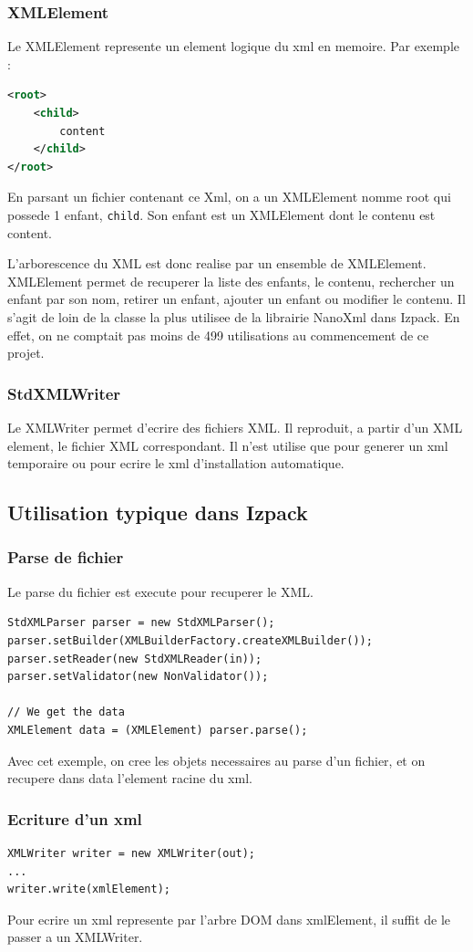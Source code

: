 \subsubsection{XMLElement}
Le XMLElement represente un element logique du xml en memoire. Par exemple :
\begin{lstlisting}[language=xml]
<root>
	<child>
		content
	</child>
</root>
\end{lstlisting}
En parsant un fichier contenant ce Xml, on a un XMLElement nomme root qui possede 1 enfant, \verb|child|. Son enfant est un XMLElement dont le contenu est content.

L'arborescence du XML est donc realise par un ensemble de XMLElement. XMLElement permet de recuperer la liste des enfants, le contenu, rechercher un enfant par son nom, retirer un enfant, ajouter un enfant ou modifier le contenu. Il s'agit de loin de la classe la plus utilisee de la librairie NanoXml dans Izpack. En effet, on ne comptait pas moins de 499 utilisations au commencement de ce projet.
\subsubsection{StdXMLWriter}
Le XMLWriter permet d'ecrire des fichiers XML. Il reproduit, a partir d'un XML element, le fichier XML correspondant. Il n'est utilise que pour generer un xml temporaire ou pour ecrire le xml d'installation automatique. 
\subsection{Utilisation typique dans Izpack}
\subsubsection{Parse de fichier}
Le parse du fichier est execute pour recuperer le XML.
\begin{lstlisting}
StdXMLParser parser = new StdXMLParser();
parser.setBuilder(XMLBuilderFactory.createXMLBuilder());
parser.setReader(new StdXMLReader(in));
parser.setValidator(new NonValidator());

// We get the data
XMLElement data = (XMLElement) parser.parse();
\end{lstlisting}
Avec cet exemple, on cree les objets necessaires au parse d'un fichier, et on recupere dans data l'element racine du xml.

\subsubsection{Ecriture d'un xml}
\begin{lstlisting}
XMLWriter writer = new XMLWriter(out);
...
writer.write(xmlElement);
\end{lstlisting}
Pour ecrire un xml represente par l'arbre DOM dans xmlElement, il suffit de le passer a un XMLWriter.

